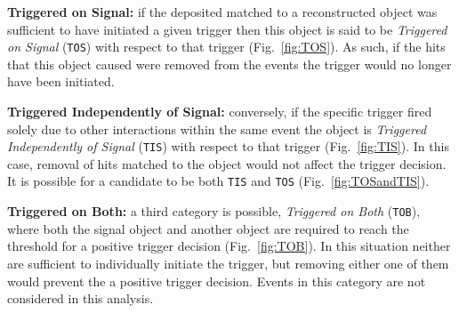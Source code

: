 \begin{description}
\item \textbf{Triggered on Signal:} if the deposited matched to a reconstructed object was sufficient to have initiated a given trigger then this object is said to be \emph{Triggered on Signal} (\texttt{TOS}) with respect to that trigger (Fig.~\ref{fig:TOS}). As such, if the hits that this object caused were removed from the events the trigger would no longer have been initiated.
\item \textbf{Triggered Independently of Signal:} conversely, if the specific trigger fired solely due to other interactions within the same event the object is \emph{Triggered Independently of Signal} (\texttt{TIS}) with respect to that trigger (Fig.~\ref{fig:TIS}). In this case, removal of hits matched to the object would not affect the trigger decision.  It is possible for a candidate to be both \texttt{TIS} and \texttt{TOS} (Fig.~\ref{fig:TOSandTIS}).
\item \textbf{Triggered on Both:} a third category is possible, \emph{Triggered on Both} (\texttt{TOB}), where both the signal object and another object are required to reach the threshold for a positive trigger decision (Fig.~\ref{fig:TOB}). In this situation neither are sufficient to individually initiate the trigger, but removing either one of them would prevent the a positive trigger decision. Events in this category are not considered in this analysis.
\end{description}

